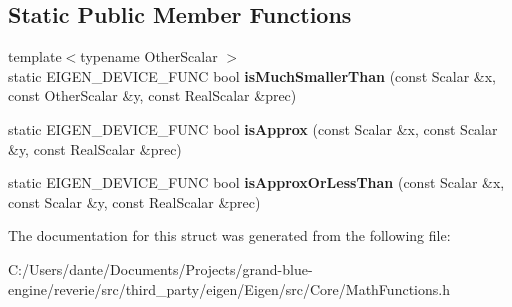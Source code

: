 \subsection*{Static Public Member Functions}
\begin{DoxyCompactItemize}
\item 
\mbox{\label{struct_eigen_1_1internal_1_1scalar__fuzzy__default__impl_3_01_scalar_00_01false_00_01false_01_4_af3f6e15738af2fa5eafa78d82fd49610}} 
{\footnotesize template$<$typename Other\+Scalar $>$ }\\static E\+I\+G\+E\+N\+\_\+\+D\+E\+V\+I\+C\+E\+\_\+\+F\+U\+NC bool {\bfseries is\+Much\+Smaller\+Than} (const Scalar \&x, const Other\+Scalar \&y, const Real\+Scalar \&prec)
\item 
\mbox{\label{struct_eigen_1_1internal_1_1scalar__fuzzy__default__impl_3_01_scalar_00_01false_00_01false_01_4_aa4c92580cf3c10157719848b15c6297d}} 
static E\+I\+G\+E\+N\+\_\+\+D\+E\+V\+I\+C\+E\+\_\+\+F\+U\+NC bool {\bfseries is\+Approx} (const Scalar \&x, const Scalar \&y, const Real\+Scalar \&prec)
\item 
\mbox{\label{struct_eigen_1_1internal_1_1scalar__fuzzy__default__impl_3_01_scalar_00_01false_00_01false_01_4_a276ae380835444368edd9e7bab6fb81a}} 
static E\+I\+G\+E\+N\+\_\+\+D\+E\+V\+I\+C\+E\+\_\+\+F\+U\+NC bool {\bfseries is\+Approx\+Or\+Less\+Than} (const Scalar \&x, const Scalar \&y, const Real\+Scalar \&prec)
\end{DoxyCompactItemize}


The documentation for this struct was generated from the following file\+:\begin{DoxyCompactItemize}
\item 
C\+:/\+Users/dante/\+Documents/\+Projects/grand-\/blue-\/engine/reverie/src/third\+\_\+party/eigen/\+Eigen/src/\+Core/Math\+Functions.\+h\end{DoxyCompactItemize}
